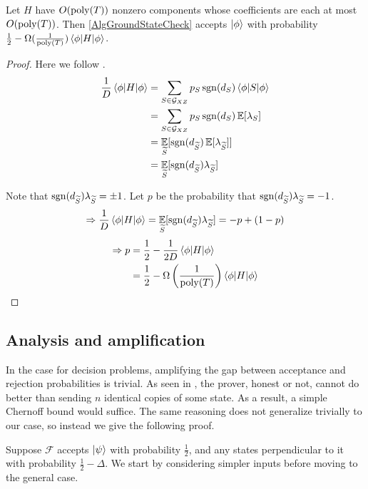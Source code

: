 \begin{theorem}\label{ThmXZCheck}
	Let $H$ have $O(\operatorname*{\operatorname{poly}}(T))$ nonzero components whose coefficients are each at most $O(\operatorname*{\operatorname{poly}}(T))$.
	Then \autoref{AlgGroundStateCheck} accepts $\ket\phi$ with probability $\frac{1}{2}-\Omega(\frac{1}{\operatorname*{\operatorname{poly}}(T)})\braket{\phi|H|\phi}$.
\end{theorem}
\begin{proof}

	Here we follow \cite{PhysRevA.93.022326}.
	\begin{align*}
		\frac{1}{D}\braket{\phi|H|\phi}&=\sum_{S\in\mathcal{G}_{XZ}} p_S\operatorname{sgn}(d_S)\braket{\phi|S|\phi}\\
		&=\sum_{S\in\mathcal{G}_{XZ}} p_S\operatorname{sgn}(d_S)\operatorname*{\mathbb{E}}[\lambda_S]\\
		&=\operatorname*{\mathbb{E}}_{\widetilde{S}}[\operatorname{sgn}(d_{\widetilde{S}})\operatorname*{\mathbb{E}}[\lambda_{\widetilde{S}}]]\\
		&=\operatorname*{\mathbb{E}}_{\widetilde{S}}[\operatorname{sgn}(d_{\widetilde{S}})\lambda_{\widetilde{S}}]
	\end{align*}

	Note that $\operatorname{sgn}(d_{\widetilde{S}})\lambda_{\widetilde{S}}=\pm1$. Let $p$ be the probability that $\operatorname{sgn}(d_{\widetilde{S}})\lambda_{\widetilde{S}}=-1$.
	$$\Rightarrow \frac{1}{D}\braket{\phi|H|\phi}=\operatorname*{\mathbb{E}}_{\widetilde{S}}[\operatorname{sgn}(d_{\widetilde{S}})\lambda_{\widetilde{S}}]=-p+(1-p)$$
	\begin{align*}
		\Rightarrow p&=\frac{1}{2}-\frac{1}{2D}\braket{\phi|H|\phi}\\
		&=\frac{1}{2}-\Omega\left(\frac{1}{\operatorname*{\operatorname{poly}}(T)}\right)\braket{\phi|H|\phi}
	\end{align*}

\end{proof}

\subsection{Analysis and amplification}

In the case for decision problems, amplifying the gap between acceptance and rejection probabilities is trivial. As seen in \cite{kitaev2002classical}, the prover, honest or not, cannot do better than sending $n$ identical copies of some state. As a result, a simple Chernoff bound would suffice. The same reasoning does not generalize trivially to our case, so instead we give the following proof.

Suppose $\mathcal{F}$ accepts $\ket{\psi}$ with probability $\frac{1}{2}$, and any states perpendicular to it with probability $\frac{1}{2}-\Delta$. We start by considering simpler inputs before moving to the general case.

